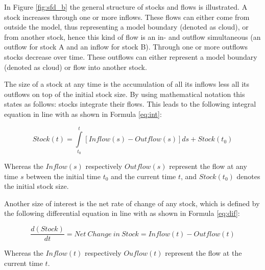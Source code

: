 In Figure \ref{fig:sfd_b} the general structure of stocks and flows is illustrated. A stock increases through one or more inflows. These flows can either come from outside the model, thus representing a model boundary (denoted as cloud), or from another stock, hence this kind of flow is an in- and outflow simultaneous (an outflow for stock A and an inflow for stock B). Through one or more outflows stocks decrease over time. These outflows can either represent a model boundary (denoted as cloud) or flow into another stock.

The size of a stock at any time is the accumulation of all its inflows less all its outflows on top of the initial stock size. By using mathematical notation this states as follows: stocks integrate their flows. This leads to the following integral equation in line with \citet[p. 194]{Sterman2000} as shown in  Formula \ref{eq:int}:

\begin{equation}\label{eq:int}
		Stock(t) = \int\limits_{t_0}^t [Inflow(s) - Outflow(s)]ds + Stock(t_0)
\end{equation}

Whereas the $Inflow(s)$ respectively $Outflow(s)$ represent the flow at any time $s$ between the initial time $t_0$ and the current time $t$, and $Stock(t_0)$ denotes the initial stock size. 

Another size of interest is the net rate of change of any stock, which is defined by the following differential equation in line with \citet[p. 194]{Sterman2000} as shown in Formula \ref{eq:dif}:

\begin{equation}\label{eq:dif}
		\frac{d(Stock)}{dt} = \mathit{Net~Change~in~Stock} = Inflow(t) - Outflow(t)
\end{equation}

Whereas the $Inflow(t)$ respectively $Ouflow(t)$ represent the flow at the current time $t$.

